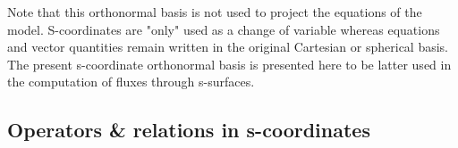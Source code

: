 Note that this orthonormal basis is not used to project the equations of the model. S-coordinates are "only" used as a change of variable whereas equations and vector quantities remain written in the original Cartesian or spherical basis. The present s-coordinate orthonormal basis is presented here to be latter used in the computation of fluxes through s-surfaces.


\subsection{Operators \& relations in s-coordinates}
\label{annexe_s-coord}

